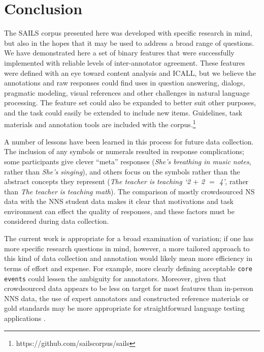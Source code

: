 \documentclass[11pt,a4paper]{article}
\newcommand{\feat}[1]{\texttt{#1}}
\newcommand{\md}[1]{\marginpar{\scriptsize MD: #1}}
\newcommand{\lk}[1]{\marginpar{\scriptsize LK: #1}}
\begin{document}
\section{Conclusion}

The SAILS corpus presented here was developed with specific research in mind, but also in the hopes that it may be used to address a broad range of questions. We have demonstrated here a set of binary features that were successfully implemented with reliable levels of inter-annotator agreement. These features were defined with an eye toward content analysis and ICALL, but we believe the annotations and raw responses could find uses in question answering, dialogs, pragmatic modeling, visual references and other challenges in natural language processing. The feature set could also be expanded to better suit other purposes, and the task could easily be extended to include new items. Guidelines, task materials and annotation tools are included with the corpus.\footnote{https://github.com/sailscorpus/sails}

\smallskip
A number of lessons have been learned in this process for future data collection. The inclusion of any symbols or numerals resulted in response complications; some participants give clever ``meta'' responses (\textit{She's breathing in music notes}, rather than \textit{She's singing}), and others focus on the symbols rather than the abstract concepts they represent (\textit{The teacher is teaching `2 $+$ 2 $=$ 4'}, rather than \textit{The teacher is teaching math}). The comparison of mostly crowdsourced NS data with the NNS student data makes it clear that motivations and task environment can effect the quality of responses, and these factors must be considered during data collection.

\smallskip
The current work is appropriate for a broad examination of variation; if one has more specific research questions in mind, however, a more tailored approach to this kind of data collection and annotation would likely mean more efficiency in terms of effort and expense. For example, more clearly defining acceptable \feat{core events} could lessen the ambiguity for annotators. Moreover, given that crowdsourced data appears to be less on target for most features than in-person NNS data, the use of expert annotators and constructed reference materials or gold standards may be more appropriate for straightforward language testing applications \citep{somasundaran:chodorow:14}.
\end{document}
